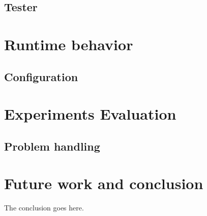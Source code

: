 \documentclass[conference]{./IEEEtran}
\begin{document}
\subsection{Tester}

\section{Runtime behavior}
\subsection{Configuration}


\section{Experiments Evaluation}

\subsection{Problem handling}

\section{Future work and conclusion}
The conclusion goes here.














\end{document}
